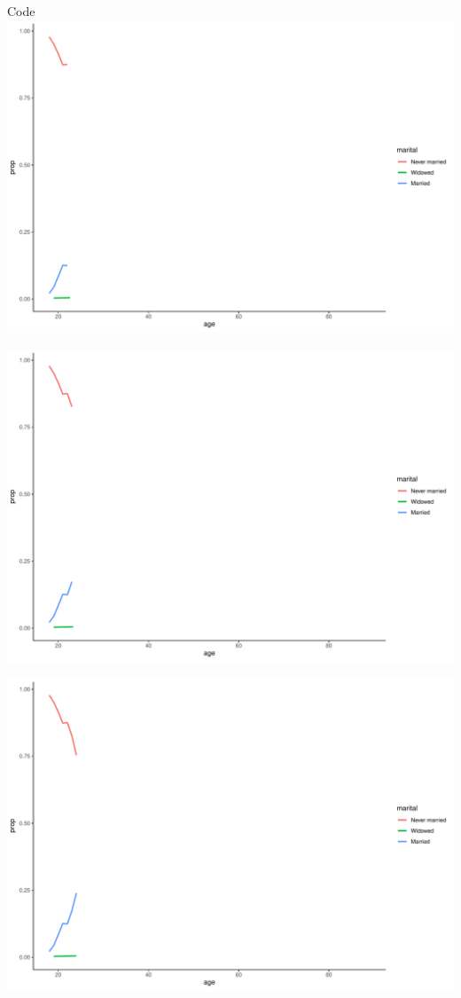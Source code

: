 \documentclass[
  ignorenonframetext,
]{beamer}
\begin{document}
\begin{frame}[fragile]{Code}
\includegraphics{gss_cat_files/figure-beamer/unnamed-chunk-1-11.pdf}

\includegraphics{gss_cat_files/figure-beamer/unnamed-chunk-1-12.pdf}

\includegraphics{gss_cat_files/figure-beamer/unnamed-chunk-1-13.pdf}


\end{frame}
\end{document}
